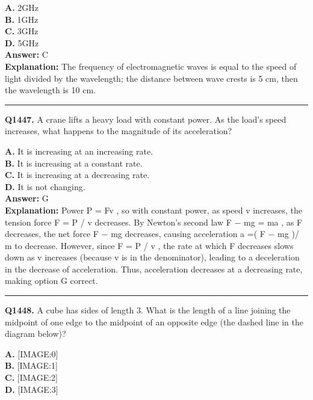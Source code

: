 \documentclass[12pt]{article}
\begin{document}
\textbf{A.} 2GHz \\
\textbf{B.} 1GHz \\
\textbf{C.} 3GHz \\
\textbf{D.} 5GHz \\

\textbf{Answer:} C \\
\textbf{Explanation:} The frequency of electromagnetic waves is equal to the speed of light divided by the wavelength; the distance between wave crests is 5 cm, then the wavelength is 10 cm.

\hrule
\vspace{1em}


\noindent
\textbf{Q1447.} A crane lifts a heavy load with constant power. As the load’s speed increases, what happens to the magnitude of its acceleration?



\textbf{A.} It is increasing at an increasing rate. \\
\textbf{B.} It is increasing at a constant rate. \\
\textbf{C.} It is increasing at a decreasing rate. \\
\textbf{D.} It is not changing. \\

\textbf{Answer:} G \\
\textbf{Explanation:} Power
P
=
Fv
, so with constant power, as speed
v
increases, the tension force
F
=
P
/
v
decreases. By Newton’s second law
F
−
mg
=
ma
, as
F
decreases, the net force
F
−
mg
decreases, causing acceleration
a
=(
F
−
mg
)/
m
to decrease. However, since
F
=
P
/
v
, the rate at which
F
decreases slows down as
v
increases (because
v
is in the denominator), leading to a deceleration in the decrease of acceleration. Thus, acceleration decreases at a decreasing rate, making option G correct.

\hrule
\vspace{1em}


\noindent
\textbf{Q1448.} A cube has sides of length 3. What is the length of a line joining the midpoint of one edge to the midpoint of an opposite edge (the dashed line in the diagram below)?



\textbf{A.} [IMAGE:0] \\
\textbf{B.} [IMAGE:1] \\
\textbf{C.} [IMAGE:2] \\
\textbf{D.} [IMAGE:3] \\
\end{document}

